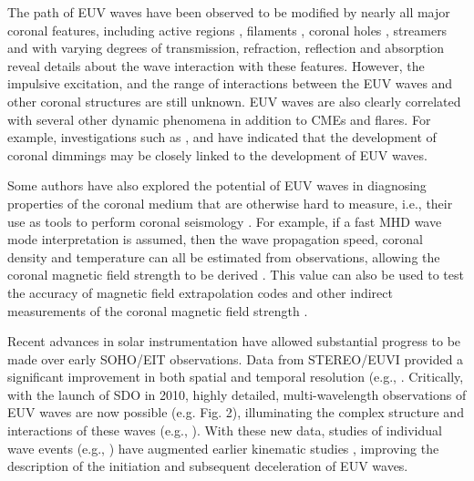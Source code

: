 \documentclass[namedreferences]{solarphysics}
\begin{document}
\begin{article}
The path of EUV waves have been observed to be modified by nearly all
major coronal features, including active regions
\citep{2000ApJ...543L..89W}, filaments \citep{2012ApJ...753...52L},
coronal holes \citep{2009ApJ...691L.123G}, streamers
\citep{2013ApJ...766...55K} and with varying degrees of transmission,
refraction, reflection and absorption reveal details about the wave
interaction with these features. However, the impulsive excitation,
and the range of interactions between the EUV waves and other coronal
structures are still unknown. EUV waves are also clearly correlated
with several other dynamic phenomena in addition to CMEs and
flares. For example, investigations such as
\cite{2000SoPh..193..161T}, \cite{2004A&A...427..705Z} and
\cite{2010ApJ...709..369P} have indicated that the development of
coronal dimmings may be closely linked to the development of EUV
waves.

Some authors have also explored the potential of EUV waves in
diagnosing properties of the coronal medium that are otherwise hard to
measure, i.e., their use as tools to perform coronal seismology
\citep{1970PASJ...22..341U}. For example, if a fast MHD wave mode
interpretation is assumed, then the wave
propagation speed, coronal density and temperature can all be
estimated from observations, allowing the coronal magnetic field
strength to be derived \citep{2005LRSP....2....3N}.  This value can
also be used to test the accuracy of magnetic field extrapolation
codes \citep{2008ApJ...675.1637S} and other indirect measurements of
the coronal magnetic field strength \citep{2007Sci...317.1192T}.


Recent advances in solar instrumentation have allowed substantial
progress to be made over early SOHO/EIT observations. Data from
STEREO/EUVI provided a significant improvement in both spatial and
temporal resolution (e.g., \cite{2008ApJ...680L..81L,
  2008ApJ...681L.113V}.  Critically, with the launch of SDO in 2010,
highly detailed, multi-wavelength observations of EUV waves are now
possible (e.g. Fig. 2), illuminating the complex structure and
interactions of these waves (e.g., \cite{2012ApJ...753...52L}). With
these new data, studies of individual wave events (e.g.,
\cite{2011ApJ...741L..21L}) have augmented earlier kinematic studies
\citep{1999SoPh..190..467W, 2000ApJ...543L..89W}, improving the
description of the initiation and subsequent deceleration of EUV
waves.


\end{article}
\end{document}
